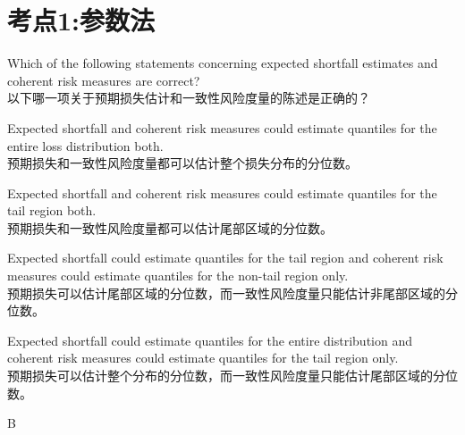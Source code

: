 \documentclass{article}
\newcounter{question} %
\begin{document}
 \tableofcontents %
\newpage




\section{考点1:参数法}
\setcounter{question}{0}


\begin{question}
    Which of the following statements concerning expected shortfall estimates and coherent risk measures are correct?\\
    以下哪一项关于预期损失估计和一致性风险度量的陈述是正确的？
\end{question}

\begin{choices}
    \item  Expected shortfall and coherent risk measures could estimate quantiles for the entire loss distribution both.\\
    预期损失和一致性风险度量都可以估计整个损失分布的分位数。
    \item  Expected shortfall and coherent risk measures could estimate quantiles for the tail region both.\\
    预期损失和一致性风险度量都可以估计尾部区域的分位数。
    \item  Expected shortfall could estimate quantiles for the tail region and coherent risk measures could estimate quantiles for the non-tail region only.\\
    预期损失可以估计尾部区域的分位数，而一致性风险度量只能估计非尾部区域的分位数。
    \item  Expected shortfall could estimate quantiles for the entire distribution and coherent risk measures could estimate quantiles for the tail region only.\\
    预期损失可以估计整个分布的分位数，而一致性风险度量只能估计尾部区域的分位数。
\end{choices}
\begin{correctanswer}
    B
\end{correctanswer}
\end{document}
